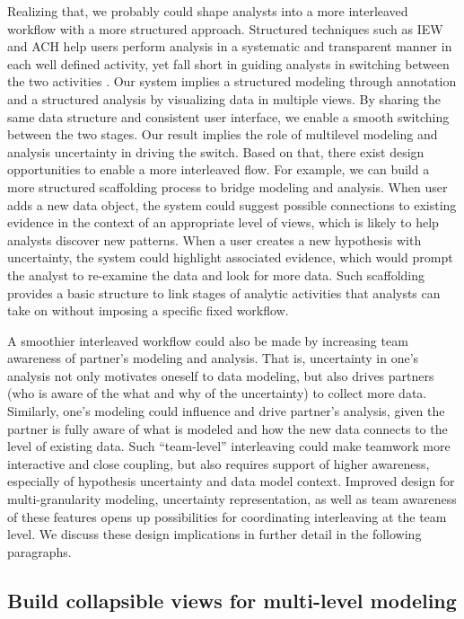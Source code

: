 Realizing that, we probably could shape analysts into a more interleaved
workflow with a more structured approach. Structured techniques such as IEW and ACH  help users
perform analysis in a systematic and transparent manner in each well defined activity, yet fall short in guiding analysts in switching between the two activities
\cite{Kang2011}. Our system implies a structured modeling through annotation and
a structured analysis by visualizing data in multiple views. By sharing the same
data structure and consistent user interface, we enable a smooth switching
between the two stages. Our result implies the role of multilevel modeling and
analysis uncertainty in driving the switch. Based on that, there exist design
opportunities to enable a more interleaved flow. For example, we can build a more structured scaffolding process to bridge modeling and analysis. When user adds a
new data object, the system could suggest possible connections to existing
evidence in the context of an appropriate level of views, which is likely to
help analysts discover new patterns. When a user creates a new hypothesis with
uncertainty, the system could highlight associated evidence, which would prompt
the analyst to re-examine the data and look for more data. Such scaffolding
provides a basic structure to link stages of analytic activities that analysts
can take on without imposing a specific fixed workflow.

A smoothier interleaved workflow could also be made by increasing team
awareness of partner's modeling and analysis. That is, uncertainty in one's
analysis not only motivates oneself to data modeling, but also drives partners
(who is aware of the what and why of the uncertainty) to collect more data.
Similarly, one's modeling could influence and drive partner's analysis, given
the partner is fully aware of what is modeled and how the new data connects to
the level of existing data. Such ``team-level'' interleaving could make teamwork
more interactive and close coupling, but also requires support of higher
awareness, especially of hypothesis uncertainty and data model context. Improved
design for multi-granularity modeling, uncertainty representation, as well as
team awareness of these features opens up possibilities for coordinating
interleaving at the team level. We discuss these design implications in further
detail in the following paragraphs.

\subsection{Build collapsible views for multi-level modeling}

